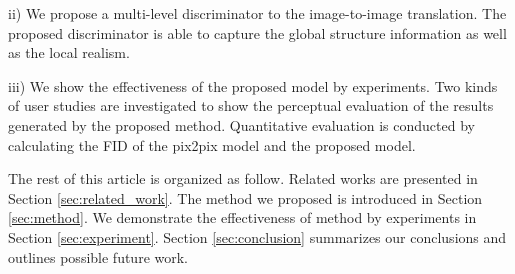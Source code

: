 ii) We propose a multi-level discriminator to the image-to-image translation. The proposed discriminator is able to capture the global structure information as well as the local realism. 

iii) We show the effectiveness of the proposed model by experiments. Two kinds of user studies are investigated to show the perceptual evaluation of the results generated by the proposed method. Quantitative evaluation is conducted by calculating the FID of the pix2pix model and the proposed model.

The rest of this article is organized as follow. Related works are presented in Section \ref{sec:related_work}. The method we proposed is introduced in Section \ref{sec:method}. We demonstrate the effectiveness of method by experiments in Section \ref{sec:experiment}. Section \ref{sec:conclusion} summarizes our conclusions and outlines 
possible future work.